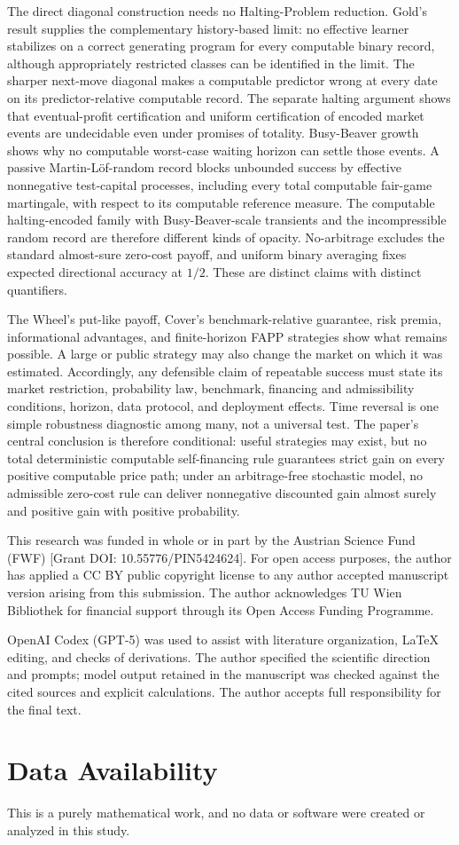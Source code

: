 \documentclass[aps,pra,reprint,superscriptaddress,amsmath,amssymb,floatfix]{revtex4-2}
\theoremstyle{plain}
\theoremstyle{definition}
\theoremstyle{remark}
\begin{document}
The direct diagonal construction needs no Halting-Problem reduction. Gold's
result supplies the complementary history-based limit: no effective
learner stabilizes on a correct generating program for every computable binary
record, although appropriately restricted classes can be identified in the
limit. The sharper next-move diagonal makes a computable predictor wrong at
every date on its predictor-relative computable record. The separate halting
argument shows that eventual-profit certification and uniform certification of
encoded market events are undecidable even under promises of totality.
Busy-Beaver growth shows why no computable worst-case waiting horizon can settle
those events. A passive Martin-L\"of-random record blocks unbounded success by
effective nonnegative test-capital processes, including every total computable
fair-game martingale, with respect to its computable reference measure. The
computable halting-encoded family with Busy-Beaver-scale transients and the
incompressible random record are therefore different kinds of opacity.
No-arbitrage excludes the standard almost-sure zero-cost payoff, and uniform
binary averaging fixes expected directional accuracy at \(1/2\). These are
distinct claims with distinct quantifiers.

The Wheel's put-like payoff, Cover's benchmark-relative guarantee, risk
premia, informational advantages, and finite-horizon FAPP strategies show what
remains possible. A large or public strategy may also change the market on
which it was estimated. Accordingly, any defensible claim of repeatable
success must state its market restriction, probability law, benchmark,
financing and admissibility conditions, horizon, data protocol, and deployment
effects. Time reversal is one simple robustness diagnostic among many, not a
universal test. The paper's central conclusion is therefore conditional:
useful strategies may exist, but no total deterministic computable
self-financing rule guarantees strict gain on every positive computable price
path; under an arbitrage-free stochastic model, no admissible zero-cost rule
can deliver nonnegative discounted gain almost surely and positive gain with
positive probability.

\begin{acknowledgments}
This research was funded in whole or in part by the Austrian Science Fund
(FWF) [Grant DOI: 10.55776/PIN5424624]. For open access purposes, the author
has applied a CC BY public copyright license to any author accepted manuscript
version arising from this submission. The author acknowledges TU Wien
Bibliothek for financial support through its Open Access Funding Programme.

OpenAI Codex (GPT-5) was used to assist with literature organization, LaTeX
editing, and checks of derivations. The author specified the scientific
direction and prompts; model output retained in the manuscript was checked
against the cited sources and explicit calculations. The author accepts full
responsibility for the final text.
\end{acknowledgments}

\section*{Data Availability}
This is a purely mathematical work, and no data or software were created or
analyzed in this study.


\end{document}
